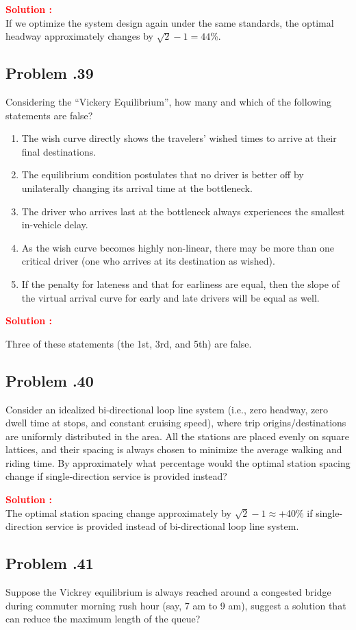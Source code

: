 \documentclass[12pt]{article}
\newcommand{\customsubsection}[1]{
  \subsection*{Problem \thesection.#1}
}
\begin{document}
\textbf{\textcolor{red}{Solution :}} \\
If we optimize the system design again under the same standards, the optimal headway approximately changes by $\sqrt{2}-1=44$\%.


\newpage


\customsubsection{39}
Considering the “Vickery Equilibrium”, how many and which of the following statements are false?
\begin{enumerate}
    \item The wish curve directly shows the travelers’ wished times to arrive at their final destinations.
    \item The equilibrium condition postulates that no driver is better off by unilaterally changing its arrival time at the bottleneck.
    \item The driver who arrives last at the bottleneck always experiences the smallest in-vehicle delay.
    \item As the wish curve becomes highly non-linear, there may be more than one critical driver (one who arrives at its destination as wished).
    \item If the penalty for lateness and that for earliness are equal, then the slope of the virtual arrival curve for early and late drivers will be equal as well.
\end{enumerate}


\textbf{\textcolor{red}{Solution :}} 

Three of these statements (the 1st, 3rd, and 5th) are false. 

\newpage


\customsubsection{40}
Consider an idealized bi-directional loop line system (i.e., zero headway, zero dwell time at stops, and constant cruising speed), where trip origins/destinations are uniformly distributed in the area. All the stations are placed evenly on square lattices, and their spacing is always chosen to minimize the average walking and riding time. By approximately what percentage would the optimal station spacing change if single-direction service is provided instead?


\textbf{\textcolor{red}{Solution :}} \\
The optimal station spacing change approximately by $\sqrt{2}-1\approx$+40\% if single-direction service is provided instead of bi-directional loop line system.



\newpage

\customsubsection{41}
Suppose the Vickrey equilibrium is always reached around a congested bridge during commuter morning rush hour (say, 7 am to 9 am), suggest a solution that can reduce the maximum length of the queue?
\end{document}
